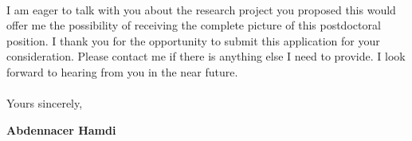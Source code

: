 \documentclass[11pt]{letter}
\begin{document}
~\par I am eager to talk with you about the research project you proposed this would offer me the possibility of receiving the complete picture of this postdoctoral position. I thank you for the opportunity to submit this application for your consideration. Please contact me if there is anything else I need to provide. I look forward to hearing from you in the near future.\\\\
Yours sincerely,

\begin{flushleft}
 {\bfseries Abdennacer Hamdi}
 \end{flushleft}
 \vfill
 
\end{document}
